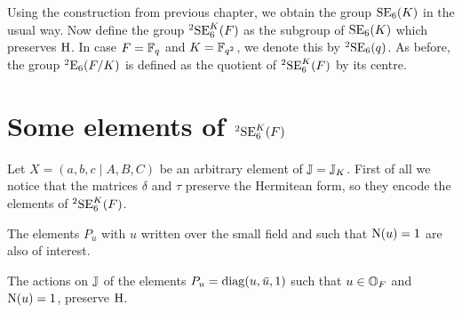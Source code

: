 Using the construction from previous chapter, we obtain the group $\mathrm{SE}_6(K)$ in the usual 
way. Now define the group ${}^2\mathrm{SE}_6^K(F)$ as the subgroup of $\mathrm{SE}_6(K)$ which preserves 
$\mathrm{H}$. In case $F = \mathbb{F}_q$ and $K = \mathbb{F}_{q^2}$, we denote this by ${}^2\mathrm{SE}_6(q)$. As before,
the group ${}^2\mathrm{E}_6(F/K)$ is defined as the quotient of ${}^2\mathrm{SE}_6^K(F)$ by its centre. 

\section{Some elements of ${}^2\mathrm{SE}_6^K(F)$}

Let $X = (a,b,c\mid A,B,C)$ be an arbitrary element of $\mathbb{J} = \mathbb{J}_K$. First of all we notice that 
the matrices $\delta$ and $\tau$ preserve the Hermitean form, so they encode the elements of 
${}^2\mathrm{SE}_6^K(F)$.

The elements $P_u$ with $u$ written over the small field and 
such that $\mathord{\mathrm{N}}(u) = 1$ are also of interest. 

\begin{lemma}
	\label{lemma:3_pu_hermitean}
	The actions on $\mathbb{J}$ of the elements $P_u = \mathrm{diag}(u,\mathord{\mbox{\hspace*{0pt}}\,\overline{\!u\!\!\;}\!\:}\mbox{\hspace*{0pt}},1)$ such that $u \in \mathbb{O}_F$ and $\mathord{\mathrm{N}}(u) = 1$,
	preserve $\mathrm{H}$.
\end{lemma}

